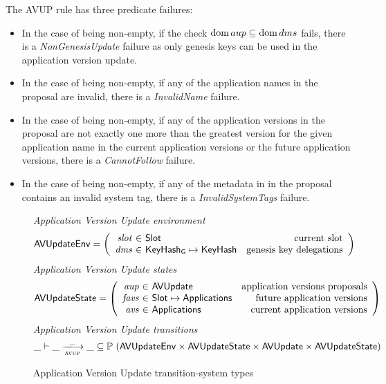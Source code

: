The AVUP rule has three predicate failures:
\begin{itemize}
\item In the case of  being non-empty, if the check $\operatorname{dom} aup \subseteq
  \operatorname{dom} dms$ fails, there is a \emph{NonGenesisUpdate} failure as only genesis keys
  can be used in the application version update.
\item In the case of  being non-empty, if any of the application names
  in the proposal are invalid, there is a \emph{InvalidName} failure.
\item In the case of  being non-empty, if any of the application versions
  in the proposal are not exactly one more than the greatest version for the given
  application name in the current application versions or the future application
  versions, there is a \emph{CannotFollow} failure.
\item In the case of  being non-empty, if any of the metadata in
  in the proposal contains an invalid system tag, there is a \emph{InvalidSystemTags} failure.
\end{itemize}

\begin{figure}[htb]
  \emph{Application Version Update environment}
  \begin{equation*}
    \AVUpdateEnv =
    \left(
      \begin{array}{r@{~\in~}lr}
        \var{slot} & \Slot & \text{current slot}\\
        \var{dms} & \KeyHashGen\mapsto\KeyHash & \text{genesis key delegations} \\
      \end{array}
    \right)
  \end{equation*}
  \emph{Application Version Update states}
  \begin{equation*}
    \AVUpdateState =
    \left(
      \begin{array}{r@{~\in~}lr}
        \var{aup} & \AVUpdate & \text{application versions proposals} \\
        \var{favs} & \Slot\mapsto\Applications & \text{future application versions} \\
        \var{avs} & \Applications & \text{current application versions} \\
      \end{array}
    \right)
  \end{equation*}
  \emph{Application Version Update transitions}
  \begin{equation*}
    \_ \vdash
    \var{\_} \trans{avup}{\_} \var{\_}
    \subseteq \powerset (\AVUpdateEnv \times \AVUpdateState \times \AVUpdate \times \AVUpdateState)
  \end{equation*}
  \caption{Application Version Update transition-system types}
  \label{fig:ts-types:av-update}
\end{figure}

